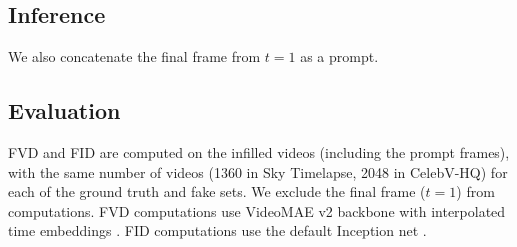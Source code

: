 \subsection{Inference}

We also concatenate the final frame from $t = 1$ as a prompt.

\subsection{Evaluation}\label{subsec:evaluation_details}

FVD and FID are computed on the infilled videos (including the prompt frames), with the same number of videos (1360 in Sky Timelapse, 2048 in CelebV-HQ) for each of the ground truth and fake sets. We exclude the final frame ($t=1$) from computations.
FVD computations use VideoMAE v2 backbone with interpolated time embeddings \cite{wang2023videomae, tong2022videomae, ge2024content}. FID computations use the default Inception net \cite{szegedy2016rethinking}.
